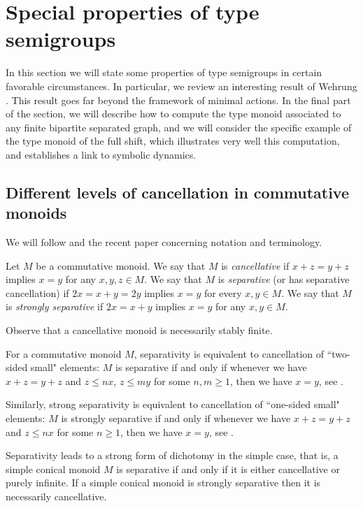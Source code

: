 \documentclass[11pt]{amsart}
\theoremstyle{plain}            %
\theoremstyle{definition}       %
\theoremstyle{definition}       %
\theoremstyle{remark}
\begin{document}
\section{Special properties of type semigroups}
\label{sect:specialprops}


In this section we will state some properties of type semigroups in certain favorable circumstances. In particular, we review an interesting result of Wehrung \cite[Theorem 5.3.8]{weh}. This result goes far beyond the framework of minimal actions. In the final part of the section, we will describe how to compute the type monoid associated to any finite bipartite separated graph, and we will consider the specific example of the type monoid of the full shift, which illustrates very well this computation, and establishes a link to symbolic dynamics.   


\subsection{Different levels of cancellation in commutative monoids}
\label{subsect:levels-of-cancellation}


We will follow \cite{AGOP} and the recent paper \cite{agnopp} concerning notation and terminology. 

Let $M$ be a commutative monoid. We say that $M$ is {\it cancellative} 
if $x + z = y + z$ implies $x = y$ for any $x, y, z \in  M$. We say that 
$M$ is {\it separative} (or has separative cancellation) if $2x = x + y = 2y$ implies $x = y$ for
every $x, y  \in M$. We say that $M$ is {\it strongly separative} if $2x = x + y$ implies $x = y$ for any
$x, y \in  M$.

Observe that a cancellative monoid is necessarily stably finite. 

For a commutative monoid $M$, separativity is equivalent to cancellation of ``two-sided small" elements: $M$ is separative if and only if whenever we have
$x+z=y+z$ and $z\le nx$, $z\le my$ for some $n,m\ge 1$, then we have $x=y$, see \cite[Lemma 2.1]{AGOP}. 

Similarly, strong separativity is equivalent to cancellation of ``one-sided small" elements: $M$ is strongly separative if and only if whenever we have
$x+z=y+z$ and $z\le nx$ for some $n\ge 1$, then we have $x=y$, see \cite[page 126]{AGOP}. 

Separativity leads to a strong form of dichotomy in the simple case, that is, a simple conical monoid $M$ is separative if and only if it is either cancellative or purely infinite. 
If a simple conical monoid is strongly separative then it is necessarily cancellative.  
\end{document}
